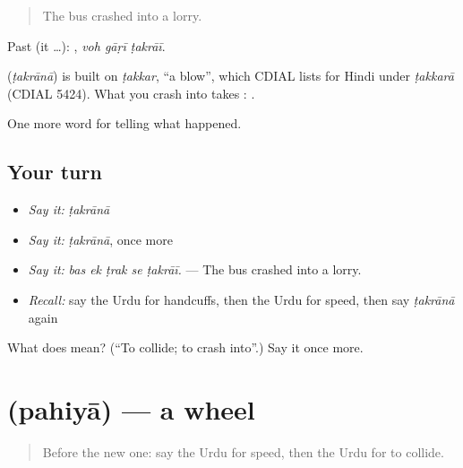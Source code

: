 \begin{quote}
The bus crashed into a lorry.
\end{quote}

Past (it …):   , \emph{voh gāṛī ṭakrāī}.

\begin{cousinweb}
\textbf{} (\emph{ṭakrānā}) is built on \emph{ṭakkar}, \textquotedblleft{}a blow\textquotedblright{}, which CDIAL lists for Hindi under \emph{ṭakkarā} (CDIAL 5424). What you crash into takes \textbf{}: \textbf{  }.
\end{cousinweb}

\begin{grammarlens}[title={What you've built}]
One more word for telling what happened.
\end{grammarlens}

\subsection*{Your turn}
\begin{itemize}
\raggedright
  \item \emph{Say it:} \emph{ṭakrānā}
  \item \emph{Say it:} \emph{ṭakrānā}, once more
  \item \emph{Say it:} \emph{bas ek ṭrak se ṭakrāī.} — The bus crashed into a lorry.
  \item \emph{Recall:} say the Urdu for handcuffs, then the Urdu for speed, then say \emph{ṭakrānā} again
\end{itemize}

\begin{tcolorbox}[breakable,colback=teal!4,colframe=teal!35!black,title={Before you move on}]
What does  mean? (\textquotedblleft{}To collide; to crash into\textquotedblright{}.) Say it once more.
\end{tcolorbox}
\section[\texorpdfstring{\ur{پہیا} (pahiyā)}{پہیا (pahiyā)}]{ (pahiyā) — a wheel}

\label{lesson:UR-C284-pahiya}



\begin{quote}
Before the new one: say the Urdu for speed, then the Urdu for to collide.
\end{quote}

